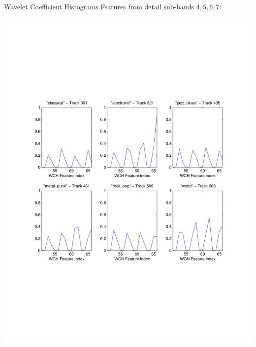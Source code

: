 \documentclass[xcolor=dvipsnames,t]{beamer} %
\begin{document}
\begin{frame}{Wavelet Coefficient Histograms}
   Features from detail sub-bands $4,5,6,7$:\\

   ~\\[-10em]
   \includegraphics[width=\textwidth]{figures/wch_diff.pdf}

\end{frame}

%
\end{document}
